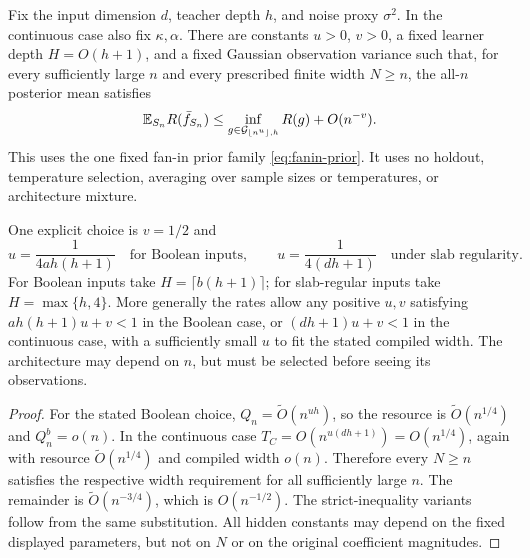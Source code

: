 \begin{corollary}
\label{cor:pure-Bayes-growing-width}
Fix the input dimension $d$, teacher depth $h$, and noise proxy $\sigma^2$. In the continuous case also fix $\kappa,\alpha$. There are constants $u>0$, $v>0$, a fixed learner depth $H=O(h+1)$, and a fixed Gaussian observation variance such that, for every sufficiently large $n$ and every prescribed finite width $N\ge n$, the all-$n$ posterior mean satisfies
\begin{equation}
 \mathbb E_{S_n}R(\bar f_{S_n})
 \le \inf_{g\in\mathcal G_{\lfloor n^u\rfloor,h}}R(g)+O(n^{-v}).
 \label{eq:pure-Bayes-growing-width}
\end{equation}
This uses the one fixed fan-in prior family \eqref{eq:fanin-prior}. It uses no holdout, temperature selection, averaging over sample sizes or temperatures, or architecture mixture.

One explicit choice is $v=1/2$ and
\[
 u=\frac1{4a h(h+1)}\quad\text{for Boolean inputs},\qquad
 u=\frac1{4(dh+1)}\quad\text{under slab regularity}.
\]
For Boolean inputs take $H=\lceil b(h+1)\rceil$; for slab-regular inputs take $H=\max\{h,4\}$. More generally the rates allow any positive $u,v$ satisfying $a h(h+1)u+v<1$ in the Boolean case, or $(dh+1)u+v<1$ in the continuous case, with a sufficiently small $u$ to fit the stated compiled width. The architecture may depend on $n$, but must be selected before seeing its observations.
\end{corollary}
\begin{proof}
For the stated Boolean choice, $Q_n=\widetilde O(n^{uh})$, so the resource is $\widetilde O(n^{1/4})$ and $Q_n^b=o(n)$. In the continuous case $T_C=O(n^{u(dh+1)})=O(n^{1/4})$, again with resource $\widetilde O(n^{1/4})$ and compiled width $o(n)$. Therefore every $N\ge n$ satisfies the respective width requirement for all sufficiently large $n$. The remainder is $\widetilde O(n^{-3/4})$, which is $O(n^{-1/2})$. The strict-inequality variants follow from the same substitution. All hidden constants may depend on the fixed displayed parameters, but not on $N$ or on the original coefficient magnitudes.
\end{proof}
